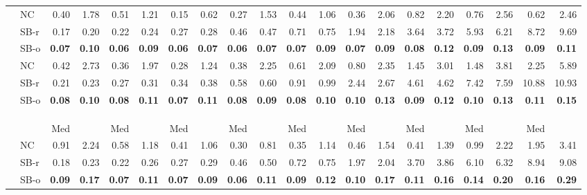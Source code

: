 \documentclass[runningheads,a4paper]{llncs}
\begin{document}
\begin{sidewaystable}
\begin{tabularx}{1\textwidth}{p{0.8cm}p{0.8cm}|RR|RR|RR|RR|RR|RR|RR|RR|RR}
\hline
\centering{} & \centering NC & 0.40 & 1.78 & 0.51 & 1.21 & 0.15 & 0.62 & 0.27 & 1.53 & 0.44 & 1.06 & 0.36 & 2.06 & 0.82 & 2.20 & 0.76 & 2.56 & 0.62 & 2.46 \\
 & \centering SB-r  & 0.17 & 0.20 & 0.22 & 0.24 & 0.27 & 0.28 & 0.46 & 0.47 & 0.71 & 0.75 & 1.94 & 2.18 & 3.64 & 3.72 & 5.93 & 6.21 & 8.72 & 9.69 \\
 & \centering SB-o  & \textbf{0.07} & \textbf{0.10} & \textbf{0.06} & \textbf{0.09} & \textbf{0.06} & \textbf{0.07} & \textbf{0.06} & \textbf{0.07} & \textbf{0.07} & \textbf{0.09} & \textbf{0.07} & \textbf{0.09} & \textbf{0.08} & \textbf{0.12} & \textbf{0.09} & \textbf{0.13} & \textbf{0.09} & \textbf{0.11} \\
\hline
\centering{} & \centering NC & 0.42 & 2.73 & 0.36 & 1.97 & 0.28 & 1.24 & 0.38 & 2.25 & 0.61 & 2.09 & 0.80 & 2.35 & 1.45 & 3.01 & 1.48 & 3.81 & 2.25 & 5.89 \\
 & \centering SB-r  & 0.21 & 0.23 & 0.27 & 0.31 & 0.34 & 0.38 & 0.58 & 0.60 & 0.91 & 0.99 & 2.44 & 2.67 & 4.61 & 4.62 & 7.42 & 7.59 & 10.88 & 10.93 \\
 & \centering SB-o  & \textbf{0.08} & \textbf{0.10} & \textbf{0.08} & \textbf{0.11} & \textbf{0.07} & \textbf{0.11} & \textbf{0.08} & \textbf{0.09} & \textbf{0.08} & \textbf{0.10} & \textbf{0.10} & \textbf{0.13} & \textbf{0.09} & \textbf{0.12} & \textbf{0.10} & \textbf{0.13} & \textbf{0.11} & \textbf{0.15} \\
\hline
\\
  & &  \\
  & &  &  &  &  &  &  &  &  &  \\
\centering  & & Med &  & Med &  & Med &  & Med &  & Med &  & Med &  & Med &  & Med &  & Med &  \\
\hline
\centering{} & \centering NC & 0.91 & 2.24 & 0.58 & 1.18 & 0.41 & 1.06 & 0.30 & 0.81 & 0.35 & 1.14 & 0.46 & 1.54 & 0.41 & 1.39 & 0.99 & 2.22 & 1.95 & 3.41 \\
 & \centering SB-r  & 0.18 & 0.23 & 0.22 & 0.26 & 0.27 & 0.29 & 0.46 & 0.50 & 0.72 & 0.75 & 1.97 & 2.04 & 3.70 & 3.86 & 6.10 & 6.32 & 8.94 & 9.08 \\
 & \centering SB-o  & \textbf{0.09} & \textbf{0.17} & \textbf{0.07} & \textbf{0.11} & \textbf{0.07} & \textbf{0.09} & \textbf{0.06} & \textbf{0.11} & \textbf{0.09} & \textbf{0.12} & \textbf{0.10} & \textbf{0.17} & \textbf{0.11} & \textbf{0.16} & \textbf{0.14} & \textbf{0.20} & \textbf{0.16} & \textbf{0.29} \\

\end{tabularx}
\end{sidewaystable}
\end{document}
